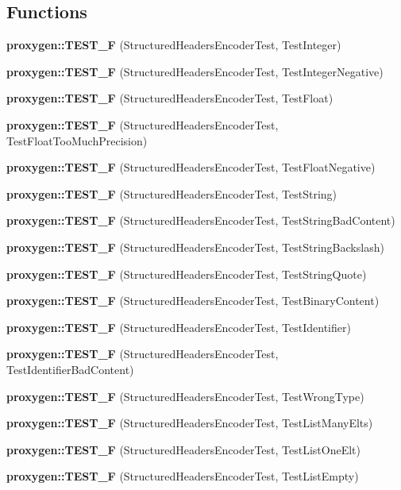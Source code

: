 \subsection*{Functions}
\begin{DoxyCompactItemize}
\item 
{\bf proxygen\+::\+T\+E\+S\+T\+\_\+F} (Structured\+Headers\+Encoder\+Test, Test\+Integer)
\item 
{\bf proxygen\+::\+T\+E\+S\+T\+\_\+F} (Structured\+Headers\+Encoder\+Test, Test\+Integer\+Negative)
\item 
{\bf proxygen\+::\+T\+E\+S\+T\+\_\+F} (Structured\+Headers\+Encoder\+Test, Test\+Float)
\item 
{\bf proxygen\+::\+T\+E\+S\+T\+\_\+F} (Structured\+Headers\+Encoder\+Test, Test\+Float\+Too\+Much\+Precision)
\item 
{\bf proxygen\+::\+T\+E\+S\+T\+\_\+F} (Structured\+Headers\+Encoder\+Test, Test\+Float\+Negative)
\item 
{\bf proxygen\+::\+T\+E\+S\+T\+\_\+F} (Structured\+Headers\+Encoder\+Test, Test\+String)
\item 
{\bf proxygen\+::\+T\+E\+S\+T\+\_\+F} (Structured\+Headers\+Encoder\+Test, Test\+String\+Bad\+Content)
\item 
{\bf proxygen\+::\+T\+E\+S\+T\+\_\+F} (Structured\+Headers\+Encoder\+Test, Test\+String\+Backslash)
\item 
{\bf proxygen\+::\+T\+E\+S\+T\+\_\+F} (Structured\+Headers\+Encoder\+Test, Test\+String\+Quote)
\item 
{\bf proxygen\+::\+T\+E\+S\+T\+\_\+F} (Structured\+Headers\+Encoder\+Test, Test\+Binary\+Content)
\item 
{\bf proxygen\+::\+T\+E\+S\+T\+\_\+F} (Structured\+Headers\+Encoder\+Test, Test\+Identifier)
\item 
{\bf proxygen\+::\+T\+E\+S\+T\+\_\+F} (Structured\+Headers\+Encoder\+Test, Test\+Identifier\+Bad\+Content)
\item 
{\bf proxygen\+::\+T\+E\+S\+T\+\_\+F} (Structured\+Headers\+Encoder\+Test, Test\+Wrong\+Type)
\item 
{\bf proxygen\+::\+T\+E\+S\+T\+\_\+F} (Structured\+Headers\+Encoder\+Test, Test\+List\+Many\+Elts)
\item 
{\bf proxygen\+::\+T\+E\+S\+T\+\_\+F} (Structured\+Headers\+Encoder\+Test, Test\+List\+One\+Elt)
\item 
{\bf proxygen\+::\+T\+E\+S\+T\+\_\+F} (Structured\+Headers\+Encoder\+Test, Test\+List\+Empty)
\item 

\end{DoxyCompactItemize}
